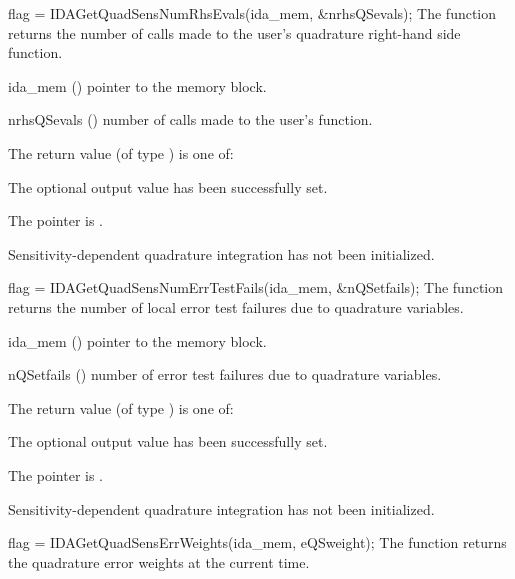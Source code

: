 {
  flag = IDAGetQuadSensNumRhsEvals(ida\_mem, \&nrhsQSevals);
}
{
  The function  returns the 
  number of calls made to the user's quadrature right-hand side function.
}
{
  \begin{args}[nrhsQSevals]
  \item[ida\_mem] ()
    pointer to the {\idas} memory block.
  \item[nrhsQSevals] ()
    number of calls made to the user's  function.
  \end{args}
}
{
  The return value  (of type ) is one of:
  \begin{args}
  \item[\Id{IDA\_SUCCESS}] 
    The optional output value has been successfully set.
  \item[\Id{IDA\_MEM\_NULL}]
    The  pointer is .
  \item[\Id{IDA\_NO\_QUADSENS}]
    Sensitivity-dependent quadrature integration has not been initialized.
  \end{args}
}
{}
{
  flag = IDAGetQuadSensNumErrTestFails(ida\_mem, \&nQSetfails);
}
{
  The function  returns the
  number of local error test failures due to quadrature variables.
}
{
  \begin{args}[nQSetfails]
  \item[ida\_mem] ()
    pointer to the {\idas} memory block.
  \item[nQSetfails] ()
    number of error test failures due to quadrature variables.
  \end{args}
}
{
  The return value  (of type ) is one of:
  \begin{args}
  \item[\Id{IDA\_SUCCESS}] 
    The optional output value has been successfully set.
  \item[\Id{IDA\_MEM\_NULL}]
    The  pointer is .
  \item[\Id{IDA\_NO\_QUADSENS}]
    Sensitivity-dependent quadrature integration has not been initialized.
  \end{args}
}
{}
{
  flag = IDAGetQuadSensErrWeights(ida\_mem, eQSweight);
}
{
  The function  returns the quadrature error weights 
  at the current time.
}
